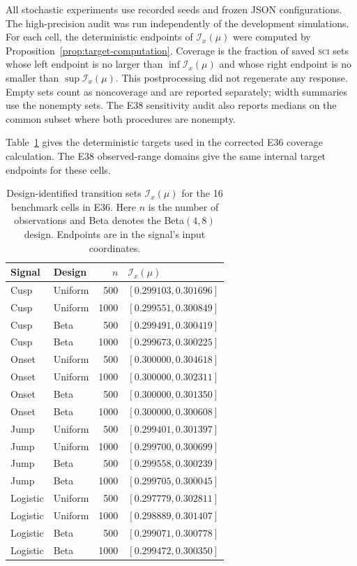 \documentclass{interact}
\theoremstyle{definition}
\theoremstyle{remark}
\newcommand{\I}{\mathcal{I}}
\newcommand{\SCI}{\textnormal{\textsc{sci}}\xspace}
\begin{document}
All stochastic experiments use recorded seeds and frozen JSON configurations.
The high-precision audit was run independently of the development simulations.
For each cell, the deterministic endpoints of $\I_x(\mu)$ were computed by
Proposition~\ref{prop:target-computation}.  Coverage is the fraction of saved
\SCI sets whose left endpoint is no larger than $\inf\I_x(\mu)$ and whose
right endpoint is no smaller than $\sup\I_x(\mu)$.  This postprocessing did
not regenerate any response.  Empty sets count as noncoverage and are reported
separately; width summaries use the nonempty sets.  The E38 sensitivity audit
also reports medians on the common subset where both procedures are nonempty.

Table~\ref{tab:identified-targets} gives the deterministic targets used in the
corrected E36 coverage calculation.  The E38 observed-range domains give the
same internal target endpoints for these cells.

\begin{table}[htbp]
\centering
\caption{Design-identified transition sets $\I_x(\mu)$ for the 16 benchmark
cells in E36.  Here $n$ is the number of observations and Beta denotes the
Beta$(4,8)$ design.  Endpoints are in the signal's input coordinates.}
\label{tab:identified-targets}
\scriptsize
\begin{tabular}{llrl}
\toprule
Signal & Design & $n$ & $\I_x(\mu)$\\
\midrule
Cusp & Uniform & 500  & $[0.299103,0.301696]$\\
Cusp & Uniform & 1000 & $[0.299551,0.300849]$\\
Cusp & Beta & 500  & $[0.299491,0.300419]$\\
Cusp & Beta & 1000 & $[0.299673,0.300225]$\\
Onset & Uniform & 500  & $[0.300000,0.304618]$\\
Onset & Uniform & 1000 & $[0.300000,0.302311]$\\
Onset & Beta & 500  & $[0.300000,0.301350]$\\
Onset & Beta & 1000 & $[0.300000,0.300608]$\\
Jump & Uniform & 500  & $[0.299401,0.301397]$\\
Jump & Uniform & 1000 & $[0.299700,0.300699]$\\
Jump & Beta & 500  & $[0.299558,0.300239]$\\
Jump & Beta & 1000 & $[0.299705,0.300045]$\\
Logistic & Uniform & 500  & $[0.297779,0.302811]$\\
Logistic & Uniform & 1000 & $[0.298889,0.301407]$\\
Logistic & Beta & 500  & $[0.299071,0.300778]$\\
Logistic & Beta & 1000 & $[0.299472,0.300350]$\\
\bottomrule
\end{tabular}
\end{table}
\end{document}
